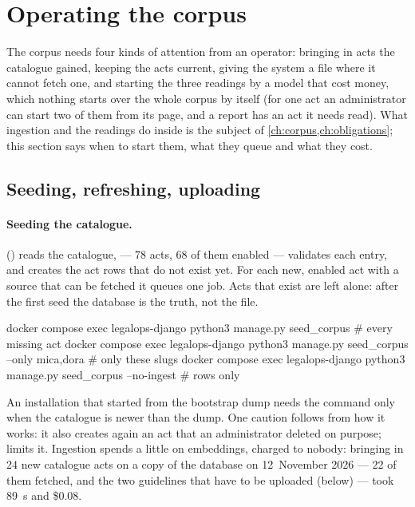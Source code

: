 \section{Operating the corpus}\label{sec:ops:corpus}

The corpus needs four kinds of attention from an operator: bringing in acts the catalogue
gained, keeping the acts current, giving the system a file where it cannot fetch one, and
starting the three readings by a model that cost money, which nothing starts over the whole
corpus by itself (for one act an administrator can start two of them from its page, and a report
has an act it needs read).
What ingestion and the readings do inside is the subject of \cref{ch:corpus,ch:obligations};
this section says when to start them, what they queue and what they cost.

\subsection{Seeding, refreshing, uploading}

\paragraph{Seeding the catalogue.} 
() reads the catalogue,
 --- 78 acts, 68 of them enabled --- validates each entry, and
creates the act rows that do not exist yet. For each new, enabled act with a source that can
be fetched it queues one  job. Acts that exist are left alone: after the
first seed the database is the truth, not the file.

\begin{codeblock}
docker compose exec legalops-django python3 manage.py seed_corpus                   # every missing act
docker compose exec legalops-django python3 manage.py seed_corpus --only mica,dora  # only these slugs
docker compose exec legalops-django python3 manage.py seed_corpus --no-ingest       # rows only
\end{codeblock}

An installation that started from the bootstrap dump needs the command only when the
catalogue is newer than the dump. One caution follows from how it works: it also creates
again an act that an administrator deleted on purpose;  limits it. Ingestion
spends a little on embeddings, charged to nobody: bringing in 24 new catalogue acts on a copy
of the database on 12~November 2026 --- 22 of them fetched, and the two guidelines that have
to be uploaded (below) --- took 89~s and \$0.08.

